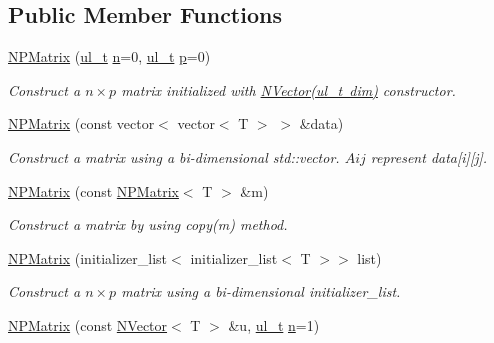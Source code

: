 \subsection*{Public Member Functions}
\begin{DoxyCompactItemize}
\item 
\mbox{\hyperlink{class_n_p_matrix_a911b2434435553b06276977f3a86bb87}{N\+P\+Matrix}} (\mbox{\hyperlink{typedef_8h_a1b140a2034db3f5dfe18a987745df43a}{ul\+\_\+t}} \mbox{\hyperlink{class_n_p_matrix_afc181b7652d9427125c72c38d7c1498d}{n}}=0, \mbox{\hyperlink{typedef_8h_a1b140a2034db3f5dfe18a987745df43a}{ul\+\_\+t}} \mbox{\hyperlink{class_n_p_matrix_a3beee8acb5babf62d2b4f212ac5d18e8}{p}}=0)
\begin{DoxyCompactList}\small\item\em Construct a $ n \times p $ matrix initialized with {\ttfamily \mbox{\hyperlink{class_n_vector_a58eee5f012e4e563d477788051fc7f1d}{N\+Vector(ul\+\_\+t dim)}}} constructor. \end{DoxyCompactList}\item 
\mbox{\hyperlink{class_n_p_matrix_ad5fc4003cdc740be5eed12134929101c}{N\+P\+Matrix}} (const vector$<$ vector$<$ T $>$ $>$ \&data)
\begin{DoxyCompactList}\small\item\em Construct a matrix using a bi-\/dimensional \textquotesingle{}std\+::vector\textquotesingle{}. $ Aij $ represent {\ttfamily data\mbox{[}i\mbox{]}\mbox{[}j\mbox{]}}. \end{DoxyCompactList}\item 
\mbox{\hyperlink{class_n_p_matrix_a0965ea26fdfab766bf993ea79fdad13c}{N\+P\+Matrix}} (const \mbox{\hyperlink{class_n_p_matrix}{N\+P\+Matrix}}$<$ T $>$ \&m)
\begin{DoxyCompactList}\small\item\em Construct a matrix by using {\ttfamily copy(m)} method. \end{DoxyCompactList}\item 
\mbox{\hyperlink{class_n_p_matrix_a738c748de3e3615da067264b629652b0}{N\+P\+Matrix}} (initializer\+\_\+list$<$ initializer\+\_\+list$<$ T $>$$>$ list)
\begin{DoxyCompactList}\small\item\em Construct a $ n \times p $ matrix using a bi-\/dimensional \textquotesingle{}initializer\+\_\+list\textquotesingle{}. \end{DoxyCompactList}\item 
\mbox{\hyperlink{class_n_p_matrix_a70eca6f9b11e5ab39db67edcba220f34}{N\+P\+Matrix}} (const \mbox{\hyperlink{class_n_vector}{N\+Vector}}$<$ T $>$ \&u, \mbox{\hyperlink{typedef_8h_a1b140a2034db3f5dfe18a987745df43a}{ul\+\_\+t}} \mbox{\hyperlink{class_n_p_matrix_afc181b7652d9427125c72c38d7c1498d}{n}}=1)
$$
\end{DoxyCompactItemize}

